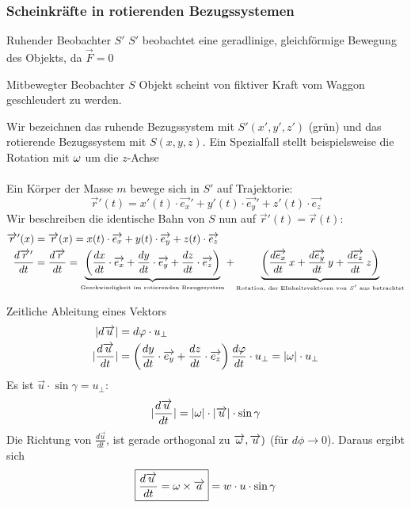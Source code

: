 \documentclass[a4paper,10pt]{scrartcl}
\begin{document}
\begin{enumerate}[a)]
\subsubsection{Scheinkräfte in rotierenden Bezugssystemen}
\begin{ex*}
\begin{seg}{Ruhender Beobachter $S'$}
 $S'$ beobachtet eine geradlinige, gleichförmige Bewegung des Objekts, da $\vec F=0$
\end{seg}
 \begin{seg}{Mitbewegter Beobachter $S$}
  Objekt scheint von fiktiver Kraft vom Waggon geschleudert zu werden. 
 \end{seg}
\end{ex*}
Wir bezeichnen das ruhende Bezugssystem mit $S'(x',y',z')$ (grün) und das rotierende Bezugssystem mit $S(x,y,z)$.
Ein Spezialfall stellt beispielsweise die Rotation mit $\w$ um die $z$-Achse 
\\ \\
Ein Körper der Masse $m$ bewege sich in $S'$ auf Trajektorie:
\[
 \vec r'(t)=x'(t)\cdot \vec{e_x}'+y'(t)\cdot \vec{e_y}'+z'(t)\cdot \vec{e_z}
\]
Wir beschreiben die identische Bahn von $S$ nun auf $\vec r'(t)=\vec r(t)$:
\begin{align*}
 \vec r'(x)&=\vec r(x)=x(t)\cdot \vec{e_x}+y(t)\cdot \vec{e_y}+z(t)\cdot \vec{e_z}\\
\frac{d\vec r'}{dt}&=\frac{d\vec r}{dt}=\underbrace{\left ( \frac{dx}{dt}\cdot \vec{e_x}+\frac{dy}{dt}\cdot \vec{e_y}+\frac{dz}{dt}\cdot \vec{e_z}\right )}_{
\text{\tiny{Geschwindigkeit im rotierenden Bezugssystem}}}+\underbrace{\left (\frac{d\vec{e_x}}{dt}\, x+\frac{d\vec{e_y}}{dt}\,y+\frac{d\vec{e_z}}{dt}\,z \right )}_{\text{\tiny{Rotation, der EInheitsvektoren von $S'$ aus betrachtet}}}
\end{align*}
\begin{seg}{Zeitliche Ableitung eines Vektors}
  \begin{align*}
   |d\vec{u}|&=d\phi\cdot u_\perp\\
   |\frac{d\vec{u}}{dt}|&=\left (\frac{dy}{dt}\cdot \vec{e_y}+\frac{dz}{dt}
 \cdot \vec{e_z}\right )\frac{d\phi}{dt}\cdot u_\perp=|\w|\cdot u_\perp
  \end{align*}
Es ist $\vec u \cdot \sin\gamma=u_\perp$:
\[
 |\frac{d\vec{u}}{dt}|=|\w|\cdot |\vec u|\cdot \sin \gamma
\]
Die Richtung von $\frac{d\vec{u}}{dt}$, ist gerade orthogonal zu $\vec{\w}, \vec u )$ (für $d\phi\rightarrow 0$).
Daraus ergibt sich 
\[
 \boxed{\frac{d\vec{u}}{dt}=\w\times \va}=w\cdot u \cdot \sin \gamma
\]
\end{seg}
\end{enumerate}
\end{document}
